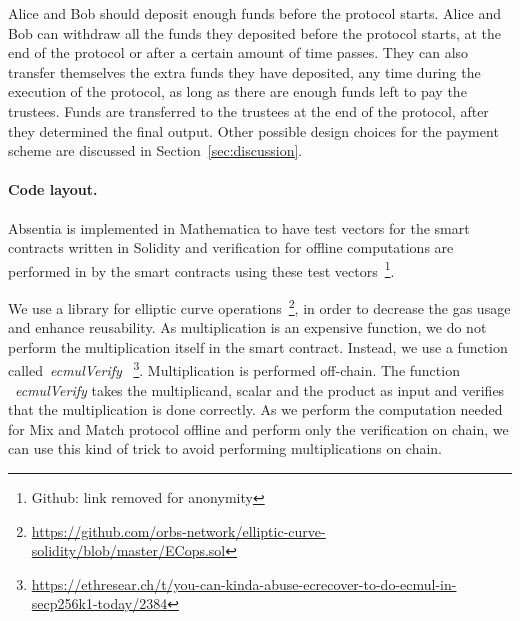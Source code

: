 Alice and Bob should deposit enough funds before the protocol starts. Alice and Bob can withdraw all the funds they deposited before the protocol starts, at the end of the protocol or after a certain amount of time passes. They can also transfer themselves the extra funds they have deposited, any time during the execution of the protocol, as long as there are enough funds left to pay the trustees. Funds are transferred to the trustees at the end of the protocol, after they determined the final output. Other possible design choices for the payment scheme are discussed in Section~\ref{sec:discussion}.




\paragraph{Code layout.} 

Absentia is implemented in Mathematica to have test vectors for the smart contracts written in Solidity and verification for offline computations are performed in by the smart contracts using these test vectors~\footnote{Github: link removed for anonymity}.

We use a library for elliptic curve operations~\footnote{\url{https://github.com/orbs-network/elliptic-curve-solidity/blob/master/ECops.sol}}, in order to decrease the gas usage and enhance reusability.  As multiplication is an expensive function, we do not perform the multiplication itself in the smart contract. Instead, we use a function called~\textit{ecmulVerify}  ~\footnote{\url{https://ethresear.ch/t/you-can-kinda-abuse-ecrecover-to-do-ecmul-in-secp256k1-today/2384}}. Multiplication is performed off-chain. The function ~\textit{ecmulVerify}  takes the multiplicand, scalar and the product as input and verifies that the multiplication is done correctly. As we perform the computation needed for Mix and Match protocol offline and perform only the verification on chain, we can use this kind of trick to avoid performing multiplications on chain.

